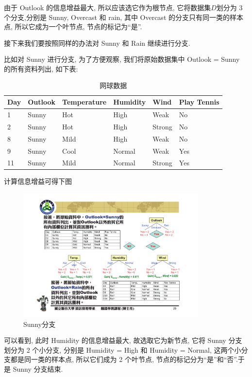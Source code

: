 \documentclass[a4paper,UTF8]{ctexart}
\theoremstyle{plain} \newtheorem{theorem}{定理}[section]
\theoremstyle{plain} \newtheorem{definition}{定义}[section]
\theoremstyle{plain} \newtheorem{lemma}{引理}[section]
\theoremstyle{plain} \newtheorem{proposition}{命题}[section]
\theoremstyle{plain} \newtheorem{example}{例}
\theoremstyle{plain} \newtheorem{remark}{注}
\theoremstyle{plain} \newtheorem{corollary}{推论}[section]
\begin{document}
由于 Outlook 的信息增益最大, 所以应该选它作为根节点, 它将数据集$D$划分为 3 个分支,分别是 Sunny, Overcast 和 rain, 其中 Overcast 的分支只有同一类的样本点, 所以它成为一个叶节点, 节点的标记为“是”.


接下来我们要按照同样的办法对 Sunny 和 Rain 继续进行分支.

比如对 Sunny 进行分支, 为了方便观察, 我们将原始数据集中 Outlook = Sunny 的所有资料列出, 如下表:
\begin{table}[!htb]
\centering
\caption{网球数据}
\label{sunny}
\begin{tabular}{l|l|l|l|l|l}
  \hline
    \textbf{Day} & \textbf{Outlook} & \textbf{Temperature} & \textbf{Humidity} & \textbf{Wind} & \textbf{Play Tennis} \\
    \hline
    1 & Sunny & Hot & High & Weak & No \\ 
    \hline
    2 & Sunny & Hot & High & Strong  & No \\ 
    \hline
    8 & Sunny & Mild & High & Weak & No \\ 
    \hline
    9 & Sunny & Cool & Normal & Weak & Yes \\ 
    \hline
    11 & Sunny & Mild & Normal & Strong & Yes \\ 
  \hline
\end{tabular}
\end{table}

计算信息增益可得下图
\begin{figure}[!htb]
	\centering
	\includegraphics[width=0.85\textwidth]{sunny.pdf}
	\caption{Sunny分支}
	\label{sunnyfig}
\end{figure}


可以看到, 此时 Humidity 的信息增益最大, 故选取它为新节点, 它将 Sunny 分支划分为 2 个小分支, 分别是 Humidity = High 和 Humidity = Normal, 这两个小分支都是同一类的样本点, 所以它们成为 2 个叶节点, 节点的标记分为“是”和“否”.于是 Sunny 分支结束.
\end{document}
